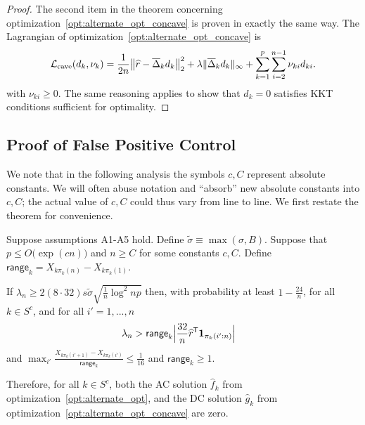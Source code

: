\begin{proof}
The second item in the theorem concerning optimization~\ref{opt:alternate_opt_concave} is proven in exactly the same way. 
The Lagrangian of optimization~\ref{opt:alternate_opt_concave} is
\[
\mathcal{L}_{\textrm{cave}}(d_k, \nu_k) = 
  \frac{1}{2n} \big\| \widehat{r} - \overline{\Delta}_k d_k \big \|_2^2 + 
  \lambda \| \overline{\Delta}_k d_k \|_\infty + \sum_{k=1}^p \sum_{i=2}^{n-1} \nu_{ki} d_{ki}.
\]
with $\nu_{ki} \geq 0$.
The same reasoning applies to show that $\hat{d}_k = 0$ satisfies KKT conditions sufficient for optimality.
\end{proof}
 
 
 
 \subsection{Proof of False Positive Control}
 \label{sec:false_positive_proof}
 
 We note that in the following analysis the symbols $c,C$ represent
 absolute constants. We will often abuse notation and ``absorb'' new
 absolute constants into $c, C$; the actual value of $c, C$ could thus
 vary from line to line.
We first restate the theorem for convenience. 

\begin{theorem} 
Suppose assumptions A1-A5 hold. Define $\tilde{\sigma} \equiv \max(\sigma, B)$. Suppose that $p \leq O\big( \exp( c n) \big)$ and $n \geq C$ for some constants $c,C$. Define $\mathsf{range}_k = X_{k\pi_k(n)} - X_{k\pi_k(1)}$.

If $\lambda_n \geq 2 (8 \cdot 32) s \tilde{\sigma}  \sqrt{ \frac{1}{n} \log^2 np}$ then, with probability at least $ 1 - \frac{24}{n}$, for all $k \in S^c$, and for all $i'=1,...,n$
\begin{align*}
& \lambda_n > \mathsf{range}_k \Big| \frac{32}{n}\widehat{r}^{\mathsf{T}} \mbox{\boldmath $1$}_{\pi_k(i':n)} \Big|  
\end{align*}
and $\max_{i'} \frac{X_{k\pi_k(i'+1)} - X_{k \pi_k(i')}}{\mathsf{range}_k} \leq \frac{1}{16}$ and $\mathsf{range}_k \geq 1$.

Therefore, for all $k \in S^c$, both the AC solution $\hat{f}_k$ from optimization~\ref{opt:alternate_opt}, and the DC solution $\hat{g}_k$ from optimization~\ref{opt:alternate_opt_concave} are zero. 
\end{theorem}

